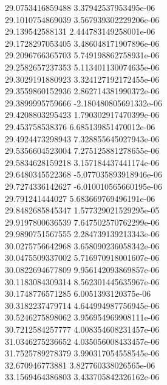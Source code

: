 {29.0753416859488 3.37942537953495e-06 \\
29.1010754869039 3.567939302229206e-06 \\
29.139542588131 2.444783149258001e-06 \\
29.1728297053405 3.486048171907896e-06 \\
29.2096766365703 5.749198862758931e-06 \\
29.2582657237353 5.113401130074635e-06 \\
29.3029191880923 3.324127192172455e-06 \\
29.3559860152936 2.862714381990372e-06 \\
29.3899995759666 -2.180480805691332e-06 \\
29.4208803295423 1.790302917470399e-06 \\
29.453758538376 6.685139851470012e-06 \\
29.4924473298943 7.328855645027943e-06 \\
29.5356604523004 7.275125881278655e-06 \\
29.5834628159218 3.157184437441174e-06 \\
29.6480345522368 -5.077035893918946e-06 \\
29.7274336142627 -6.010010565660195e-06 \\
29.791241444027 5.683669769496191e-06 \\
29.8482685845347 1.577329021529295e-05 \\
29.9197800636539 7.647502570762299e-06 \\
29.9890751567555 2.284739139213343e-06 \\
30.0275756642968 3.658090236058342e-06 \\
30.0475509337002 5.716970918001607e-06 \\
30.0822694677809 9.956142093869857e-06 \\
30.1183084309314 8.562301445635967e-06 \\
30.1748776571285 6.0051393120375e-06 \\
30.3182237479714 4.644994987756945e-06 \\
30.5246275898062 3.956954969908111e-06 \\
30.7212584257777 4.008354608231457e-06 \\
31.0346275236652 4.035056008433457e-06 \\
31.7525789278379 3.990317054558545e-06 \\
32.670946773881 3.827760338026565e-06 \\
33.1569464386803 3.433705842326162e-06 \\
}
